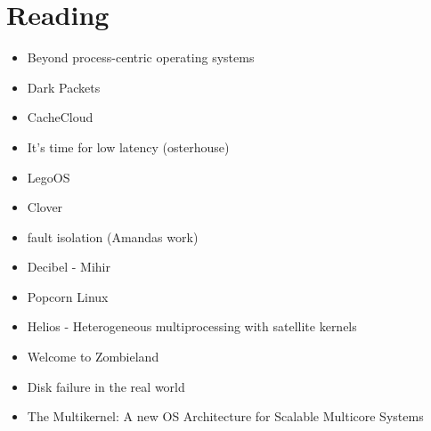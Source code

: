 \section{Reading}
\label{sec:reading}
\begin{itemize}
    \item{Beyond process-centric operating systems}~\cite{189914}\rpaper{}
    \item{Dark Packets}\rabstract{}
    \item{CacheCloud}~\cite{cachecloud}\rintro{+}
    \item{It's time for low latency (osterhouse)}
    \item{LegoOS}\cite{legoos}\rpaper{}
    \item {Clover}\cite{clover}\rpaper{}
    \item{fault isolation (Amandas work)}\rintro{}
    \item{Decibel - Mihir}\rabstract{}
    \item{Popcorn Linux}
    \item{Helios - Heterogeneous multiprocessing with satellite kernels}~\cite{helios}\rabstract{}
    \item{Welcome to Zombieland}~\cite{zombieland}\rintro{}
    \item{Disk failure in the real world}~\cite{Schroeder:2007:DFR:1267903.1267904}\rabstract{}
    \item{The Multikernel: A new OS Architecture for Scalable Multicore Systems}~\cite{the-multikernel}\rabstract{}

\end{itemize}
